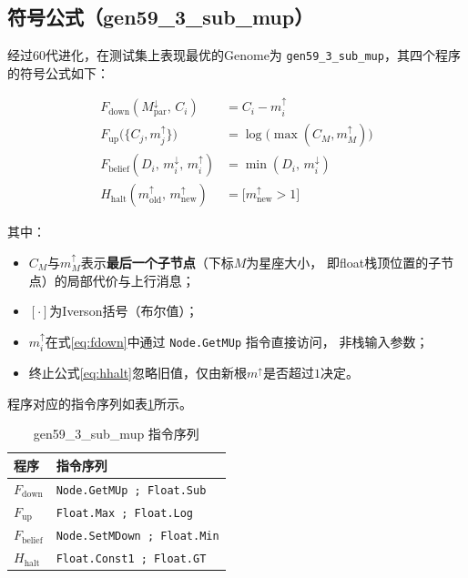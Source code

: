 \documentclass[12pt, a4paper]{ctexart}
\newcommand{\cbox}[1]{%
  \begingroup
  \setlength{\fboxsep}{4pt}%
  \colorbox{ccode}{\texttt{\small #1}}%
  \endgroup
}
\begin{document}
\subsection{符号公式（gen59\_3\_sub\_mup）}

经过60代进化，在测试集上表现最优的Genome为
\texttt{gen59\_3\_sub\_mup}，其四个程序的符号公式如下：

\begin{align}
  F_{\mathrm{down}}(M^{\downarrow}_{\mathrm{par}},\,C_i) &= C_i - m^\uparrow_i
    \label{eq:fdown}\\
  F_{\mathrm{up}}\bigl(\{C_j, m^\uparrow_j\}\bigr) &= \log\!\bigl(\max(C_M, m^\uparrow_M)\bigr)
    \label{eq:fup}\\
  F_{\mathrm{belief}}(D_i,\,m^\downarrow_i,\,m^\uparrow_i) &= \min(D_i,\,m^\downarrow_i)
    \label{eq:fbelief}\\
  H_{\mathrm{halt}}(m^\uparrow_{\mathrm{old}},\,m^\uparrow_{\mathrm{new}}) &=
    \bigl[m^\uparrow_{\mathrm{new}} > 1\bigr]
    \label{eq:hhalt}
\end{align}

其中：
\begin{itemize}[leftmargin=2em]
  \item $C_M$与$m^\uparrow_M$表示\textbf{最后一个子节点}（下标$M$为星座大小，
        即float栈顶位置的子节点）的局部代价与上行消息；
  \item $[\cdot]$为Iverson括号（布尔值）；
  \item $m^\uparrow_i$在式\eqref{eq:fdown}中通过\cbox{Node.GetMUp}指令直接访问，
        非栈输入参数；
  \item 终止公式\eqref{eq:hhalt}忽略旧值，仅由新根$m^\uparrow$是否超过$1$决定。
\end{itemize}

程序对应的指令序列如表\ref{tab:genome_prog}所示。

\begin{table}[H]
  \centering
  \caption{gen59\_3\_sub\_mup 指令序列}
  \label{tab:genome_prog}
  \begin{tabular}{ll}
    \toprule
    程序 & 指令序列 \\
    \midrule
    $F_{\mathrm{down}}$ & \cbox{Node.GetMUp ; Float.Sub} \\
    $F_{\mathrm{up}}$   & \cbox{Float.Max ; Float.Log} \\
    $F_{\mathrm{belief}}$ & \cbox{Node.SetMDown ; Float.Min} \\
    $H_{\mathrm{halt}}$   & \cbox{Float.Const1 ; Float.GT} \\
    \bottomrule
  \end{tabular}
\end{table}
\end{document}

